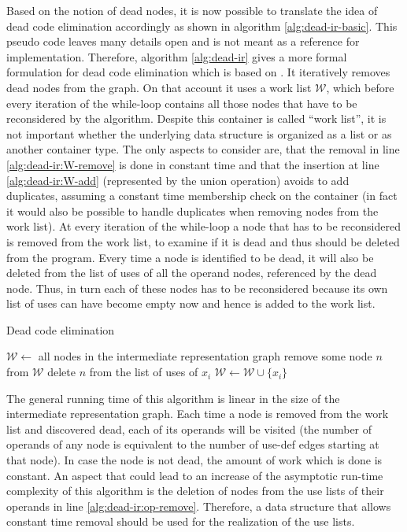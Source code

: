Based on the notion of dead nodes, it is now possible to translate the idea of dead code elimination accordingly as shown in algorithm \ref{alg:dead-ir-basic}. This pseudo code leaves many details open and is not meant as a reference for implementation. Therefore, algorithm \ref{alg:dead-ir} gives a more formal formulation for dead code elimination which is based on \cite{appel:2004:moderncompilerimpl}. It iteratively removes dead nodes from the graph. On that account it uses a work list $\mathcal{W}$, which before every iteration of the while-loop contains all those nodes that have to be reconsidered by the algorithm. Despite this container is called ``work list'', it is not important whether the underlying data structure is organized as a list or as another container type. The only aspects to consider are, that the removal in line \ref{alg:dead-ir:W-remove} is done in constant time and that the insertion at line \ref{alg:dead-ir:W-add} (represented by the union operation) avoids to add duplicates, assuming a constant time membership check on the container (in fact it would also be possible to handle duplicates when removing nodes from the work list). At every iteration of the while-loop a node that has to be reconsidered is removed from the work list, to examine if it is dead and thus should be deleted from the program. Every time a node is identified to be dead, it will also be deleted from the list of uses of all the operand nodes, referenced by the dead node. Thus, in turn each of these nodes has to be reconsidered because its own list of uses can have become empty now and hence is added to the work list.

\begin{algorithm}[H]
\caption{Dead code elimination}
\label{alg:dead-ir}
\begin{algorithmic}[1]
\State $\mathcal{W} \gets$ all nodes in the intermediate representation graph\label{alg:dead-ir:W-init}
	\State remove some node $n$ from $\mathcal{W}$\label{alg:dead-ir:W-remove}
			\State delete $n$ from the list of uses of $x_i$\label{alg:dead-ir:op-remove}
			\State $\mathcal{W} \gets \mathcal{W} \cup \lbrace x_i\rbrace$\label{alg:dead-ir:W-add}
		\EndFor
	\EndIf
\EndWhile
\end{algorithmic}
\end{algorithm}

The general running time of this algorithm is linear in the size of the intermediate representation graph. Each time a node is removed from the work list and discovered dead, each of its operands will be visited (the number of operands of any node is equivalent to the number of use-def edges starting at that node). In case the node is not dead, the amount of work which is done is constant. An aspect that could lead to an increase of the asymptotic run-time complexity of this algorithm is the deletion of nodes from the use lists of their operands in line \ref{alg:dead-ir:op-remove}. Therefore, a data structure that allows constant time removal should be used for the realization of the use lists.